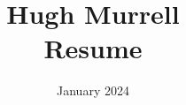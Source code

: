 \documentclass[12pt]{article}
\title{
           Hugh Murrell \\
           Resume \\
       }
\date{January 2024}
\begin{document}
\maketitle


%

\small
\end{document}
